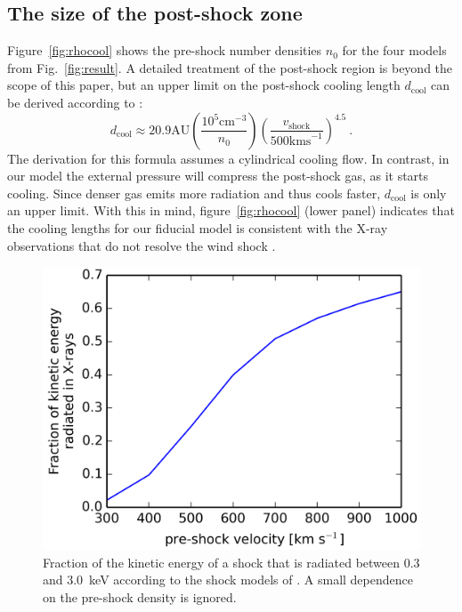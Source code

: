 \documentclass{emulateapj}
\begin{document}
\subsection{The size of the post-shock zone}
Figure~\ref{fig:rhocool} shows the pre-shock number densities $n_0$ for the four models from Fig.~\ref{fig:result}. A detailed treatment of the post-shock region is beyond the scope of this paper, but an upper limit on the post-shock cooling length $d_{\mathrm{cool}}$ can be derived according to \citet{2002ApJ...576L.149R}:
\begin{equation}
d_{\mathrm{cool}} \approx 20.9 \mathrm{ AU}
    \left(\frac{10^5\mathrm{ cm}^{-3}}{n_0}\right)
    \left(\frac{v_{\mathrm{shock}}}{500\mathrm{ km s}^{-1}}\right)^{4.5}\ .
\end{equation}
The derivation for this formula assumes a cylindrical cooling flow. In contrast, in our model the external pressure will compress the post-shock gas, as it starts cooling. Since denser gas emits more radiation and thus cools faster, $d_{\mathrm{cool}}$ is only an upper limit. With this in mind, figure~\ref{fig:rhocool} (lower panel) indicates that the cooling lengths for our fiducial model is consistent with the X-ray observations that do not resolve the wind shock \citep{2008A&A...488L..13S}.


\begin{figure}[h!]
\begin{center}
\includegraphics[width=0.7\columnwidth]{figures/fracxray/fracxray.png}
\caption{\label{fig:fracxray}
Fraction of the kinetic energy of a shock that is radiated between 0.3 and 3.0~keV according to the shock models of . A small dependence on the pre-shock density is ignored.
}
\end{center}
\end{figure}
\end{document}
